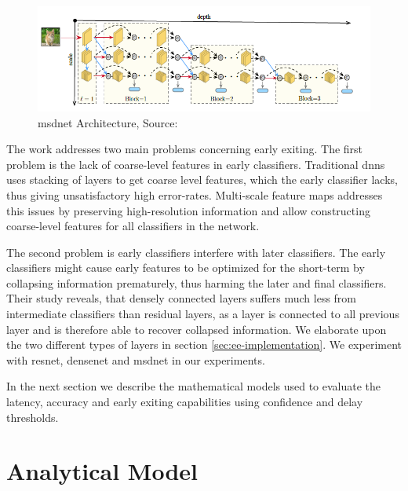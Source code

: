 \begin{figure}
	\centering
	\includegraphics[width=\linewidth]{figures/models/msdnet}
	\caption[\gls{msdnet} Architecture]{\gls{msdnet} Architecture, Source:  \cite{huang_multi-scale_2017}}
	\label{fig:msdnet}
\end{figure}

The work addresses two main problems concerning early exiting. The first problem is the lack of coarse-level features in early classifiers. Traditional \gls{dnn}s uses stacking of layers to get coarse level features, which the early classifier lacks, thus giving unsatisfactory high error-rates. Multi-scale feature maps addresses this issues by preserving high-resolution information and allow constructing coarse-level features for all classifiers in the network.

The second problem is early classifiers interfere with later classifiers. The early classifiers might cause early features to be optimized for the short-term by collapsing information prematurely, thus harming the later and final classifiers. Their study reveals, that densely connected layers suffers much less from intermediate classifiers than residual layers, as a layer is connected to all previous layer and is therefore able to recover collapsed information. We elaborate upon the two different types of layers in section \ref{sec:ee-implementation}. We experiment with \gls{resnet}, \gls{densenet} and \gls{msdnet} in our experiments.

In the next section we describe the mathematical models used to evaluate the latency, accuracy and early exiting capabilities using confidence and delay thresholds.

\section{Analytical Model} \label{sec:ee-metrics}

